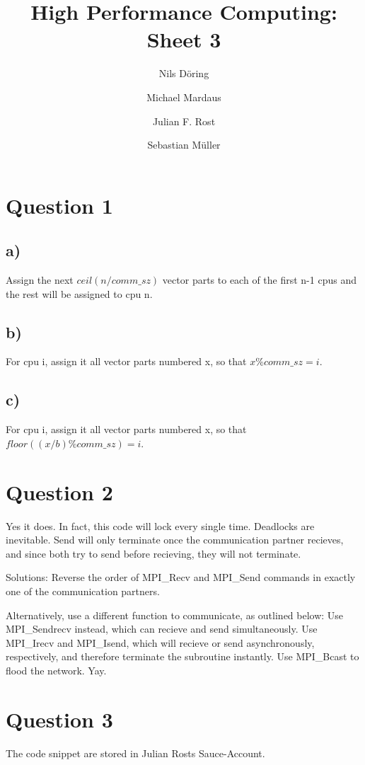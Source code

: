 \documentclass[10pt,a4paper]{scrartcl}
\author{Nils Döring \and Michael Mardaus \and Julian F. Rost \and Sebastian Müller}
\title{High Performance Computing: Sheet 3}
\begin{document}
\maketitle


\section{Question 1}

\subsection{a)} Assign the next $ceil(n / comm\_sz)$ vector parts to each of the first n-1 cpus and the rest will be assigned to cpu n.
\subsection{b)} For cpu i, assign it all vector parts numbered x, so that $x \% comm\_sz = i$.
\subsection{c)} For cpu i, assign it all vector parts numbered x, so that $floor( (x / b) \% comm\_sz ) = i$.

\section{Question 2}

Yes it does. In fact, this code will lock every single time. Deadlocks are inevitable. Send will only terminate once the communication partner recieves, and since both try to send before recieving, they will not terminate.

Solutions:
Reverse the order of MPI\_Recv and MPI\_Send commands in exactly one of the communication partners.

Alternatively, use a different function to communicate, as outlined below:
Use MPI\_Sendrecv instead, which can recieve and send simultaneously.
Use MPI\_Irecv and MPI\_Isend, which will recieve or send asynchronously, respectively, and therefore terminate the subroutine instantly.
Use MPI\_Bcast to flood the network. Yay.

\section{Question 3}

The code snippet are stored in Julian Rosts Sauce-Account.
\end{document}
